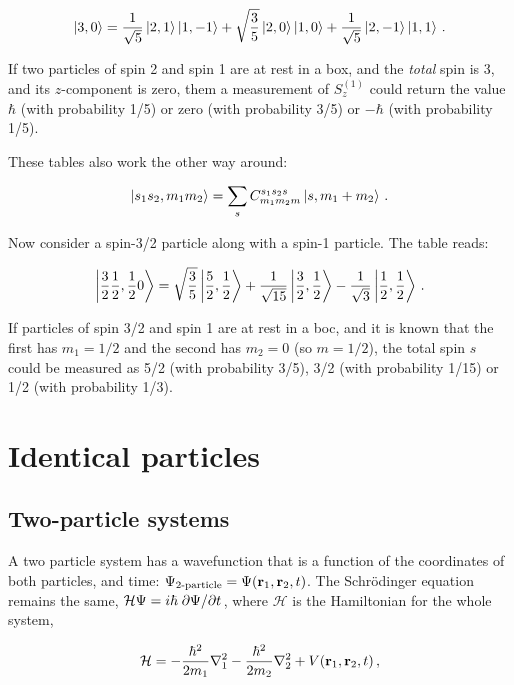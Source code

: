 \documentclass[12pt, titlepage]{article}
\begin{document}
\begin{equation*}
	\ket{3,0} = \frac{1}{\sqrt{5}}\ket{2,1}\ket{1,-1} + \sqrt{\frac{3}{5}}\ket{2,0}\ket{1,0} + \frac{1}{\sqrt{5}}\ket{2,-1}\ket{1,1} \,.
\end{equation*}

If two particles of spin 2 and spin 1 are at rest in a box, and the \emph{total} spin is 3, and its $z$-component is zero, them a measurement of $S_z^{(1)}$ could return the value $\hbar$ (with probability 1/5) or zero (with probability 3/5) or $-\hbar$ (with probability 1/5).

These tables also work the other way around:

\begin{equation}
	\ket{s_1s_2,m_1m_2} = \sum_{s}C_{m_1m_2m}^{s_1s_2s}\ket{s,m_1+m_2} \,.
\end{equation}

Now consider a spin-3/2 particle along with a spin-1 particle. The table reads:

\begin{equation}
	\ket{\frac{3}{2}\frac{1}{2}, \frac{1}{2}0} = \sqrt{\frac{3}{5}}\ket{\frac{5}{2},\frac{1}{2}} + \frac{1}{\sqrt{15}}\ket{\frac{3}{2},\frac{1}{2}} - \frac{1}{\sqrt{3}}\ket{\frac{1}{2},\frac{1}{2}} \,.
\end{equation}

If particles of spin 3/2 and spin 1 are at rest in a boc, and it is known that the first has $m_1=1/2$ and the second has $m_2=0$ (so $m=1/2$), the total spin $s$ could be measured as 5/2 (with probability 3/5), 3/2 (with probability 1/15) or 1/2 (with probability 1/3).

\section{Identical particles}
\subsection{Two-particle systems}
A two particle system has a wavefunction that is a function of the coordinates of both particles, and time: $\Psi_{2\text{-particle}} = \Psi(\vb{r}_1,\vb{r}_2,t)$. The Schrödinger equation remains the same, $\mathcal{H}\Psi = i\hbar\pdv*{\Psi}{t}$, where $\mathcal{H}$ is the Hamiltonian for the whole system, 

\begin{equation}
	\mathcal{H} = -\frac{\hbar^2}{2m_1}\laplacian{}_{1} - \frac{\hbar^2}{2m_2}\laplacian{}_2 + V(\vb{r}_1, \vb{r}_2, t)\,,
\end{equation}
\end{document}
